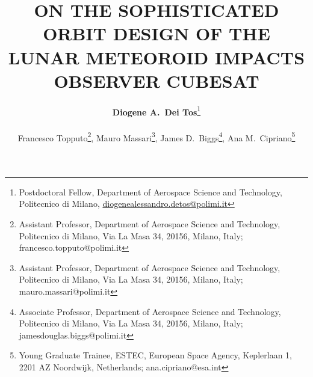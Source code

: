 
\title[IAC2018]{\large ON THE SOPHISTICATED ORBIT DESIGN OF THE LUNAR METEOROID IMPACTS OBSERVER CUBESAT}


\author{\large {\bfseries Diogene A.\ Dei Tos}\thanks{Postdoctoral Fellow, Department of Aerospace Science and Technology, Politecnico di Milano, \href{mailto:diogenealessandro.detos@polimi.it}{diogenealessandro.detos@polimi.it}}
\\~\\
\large {Francesco Topputo}\thanks{Assistant Professor, Department of Aerospace Science and Technology, Politecnico di Milano, Via La Masa 34, 20156, Milano, Italy; francesco.topputo@polimi.it},
\large {Mauro Massari}\thanks{Assistant Professor, Department of Aerospace Science and Technology, Politecnico di Milano, Via La Masa 34, 20156, Milano, Italy; mauro.massari@polimi.it},
\large {James D.\ Biggs}\thanks{Associate Professor, Department of Aerospace Science and Technology, Politecnico di Milano, Via La Masa 34, 20156, Milano, Italy; jamesdouglas.biggs@polimi.it},
\large {Ana M.\ Cipriano}\thanks{Young Graduate Trainee, ESTEC, European Space Agency, Keplerlaan 1, 2201 AZ Noordwijk, Netherlands; ana.cipriano@esa.int}}